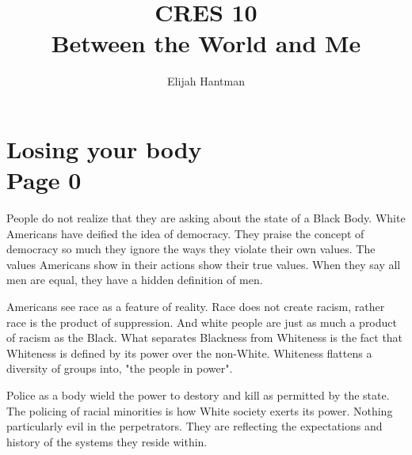 \documentclass{report}
\title{\Huge{CRES 10}\\Between the World and Me}
\author{\huge{Elijah Hantman}}
\date{}
\begin{document}
\maketitle
\newpage

\section[Section Title. Section Subtitle]{Losing your body
        \\ {\large Page 0}}

People do not realize that they are asking
about the state of a Black Body.
White Americans have deified the idea of 
democracy. They praise the concept of democracy
so much they ignore the ways they violate
their own values.
The values Americans show in their actions show
their true values. When they say all men are equal,
they have a hidden definition of men.

Americans see race as a feature of reality. Race
does not create racism, rather race is the product
of suppression. And white people are just as much a
product of racism as the Black. What separates Blackness
from Whiteness is the fact that Whiteness is defined
by its power over the non-White. Whiteness flattens
a diversity of groups into, "the people in power".

Police as a body wield the power to destory and kill
as permitted by the state. The policing of racial
minorities is how White society exerts its power.
Nothing particularly evil in the perpetrators. They
are reflecting the expectations and history of the
systems they reside within.
\end{document}
